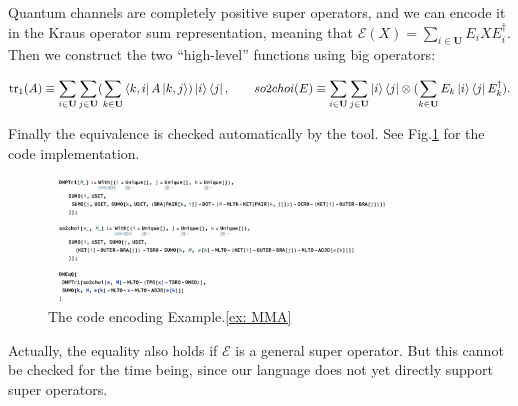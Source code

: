 Quantum channels are completely positive super operators, and we can encode it in the Kraus operator sum representation, meaning that $\mathcal{E}(X) = \sum_{i \in \mathbf{U}} E_i X E_i^\dagger$. Then we construct the two ``high-level'' functions using big operators:

  \begin{gather*}
    \mathrm{tr}_1(A) \equiv \sum_{i\in\mathbf{U}}\sum_{j\in\mathbf{U}} (\sum_{k\in\mathbf{U}} \bra{k, i} A \ket{k, j}) \ket{i}\bra{j},
    \qquad
    so2choi(E) \equiv \sum_{i\in\mathbf{U}}\sum_{j\in\mathbf{U}} \ket{i}\bra{j} \otimes (\sum_{k\in\mathbf{U}} E_k \ket{i}\bra{j} E_k^\dagger).
  \end{gather*}

  Finally the equivalence is checked automatically by the tool. See Fig.\ref{fig: MMA ex} for the code implementation.

\begin{figure}
  \includegraphics*[width=0.8\textwidth]{fig/MMAexample.png}
  \caption{The code encoding Example.\ref{ex: MMA} }
  \label{fig: MMA ex}
\end{figure}

Actually, the equality also holds if $\mathcal{E}$ is a general super operator. But this cannot be checked for the time being, since our language does not yet directly support super operators.